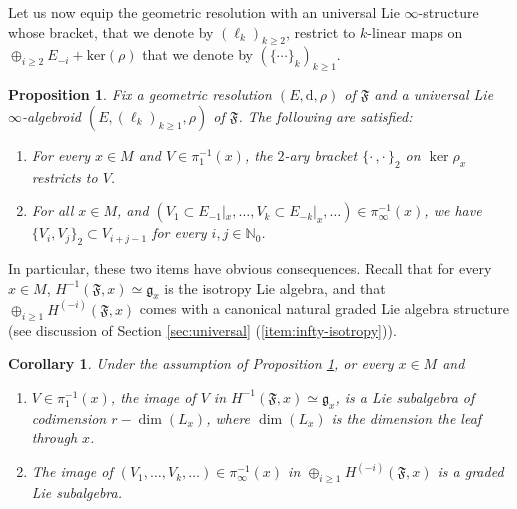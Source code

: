 \documentclass[10pt]{article}
\theoremstyle{plain}
\newtheorem{proposition}[lemma]{Proposition}
\newtheorem{corollary}[lemma]{Corollary}
\theoremstyle{definition}
\theoremstyle{remark}
\newcommand{\dd}{\mathrm{d}}
\begin{document}
Let us now equip the geometric resolution with an universal Lie $ \infty$-structure whose bracket, that we denote by $(\ell_k)_{k \geq 2}$, restrict to $k $-linear maps on $ \oplus_{i \geq 2}  E_{-i} + {\mathrm{ker}}(\rho)$ that we denote by $(\{\cdots \}_k)_{k \geq 1} $. 
 
 \begin{proposition}\label{thm:grass} Fix a geometric resolution $(E, \dd, \rho)$ of $\mathfrak F$ and a universal Lie $\infty$-algebroid $(E,(\ell_k)_{k\geq 1}, 
 \rho)$ of $\mathfrak
 F$. The following are satisfied:
\begin{enumerate}
\item For every $x\in M$ and $V\in \pi_1^{-1}(x)$, the $2$-ary bracket $\{\cdot\,,\cdot\,\}_2$ on $\ker \rho_x$ restricts to $V$.
\item For all $x\in M$, and $\left(V_{1}\subset E_{-1}|_x,\ldots, V_k\subset E_{-k}|_x,\ldots\right)\in \pi^{-1}_\infty(x)$, we have $\{V_i,V_j\}_2\subset V_{i+j-1}$ for every $i, j\in \mathbb N_0$.
   
\end{enumerate}

\end{proposition}
In particular, these two items have obvious consequences. 
Recall that for every $x \in M$, $H^{-1}(\mathfrak{F},x)\simeq \mathfrak{g}_x$ is the isotropy Lie algebra, and that $\oplus_{i\geq 1}H^{(-i)}(\mathfrak F,x)$ comes with a canonical natural graded Lie algebra structure (see discussion of Section \ref{sec:universal} (\ref{item:infty-isotropy})).


\begin{corollary}
 Under the assumption of Proposition \ref{thm:grass}, or every $x\in M$ and 
 \begin{enumerate}
     \item $V\in \pi_1^{-1}(x)$,  the image of  $V$ in  $H^{-1}(\mathfrak{F},x)\simeq \mathfrak{g}_x$, is a Lie subalgebra of codimension $r-\dim(L_x)$, where $\dim (L_x)$ is the dimension the leaf through $x$.  

     \item The image of $(V_1, \ldots, V_k,\ldots)\in \pi_\infty^{-1}(x)$ in $\oplus_{i\geq 1}H^{(-i)}(\mathfrak F,x)$ is a graded Lie subalgebra.
 \end{enumerate}
\end{corollary}
\end{document}
